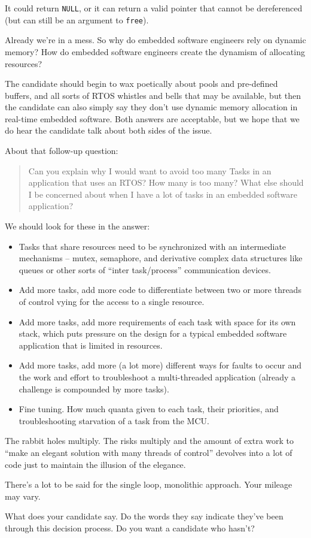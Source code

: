 \documentclass[12pt]{article}
\newcommand{\NULL}{{\texttt{NULL}}}%
\begin{document}
\begin{enumerate}
It could return \NULL, or it can return a valid pointer that cannot be dereferenced (but can still be an argument to {\texttt{free}}).

Already we're in a mess. So why do embedded software engineers rely on dynamic memory?  How do embedded software engineers create
the dynamism of allocating resources?  

The candidate should begin to wax poetically about pools and pre-defined buffers, and all sorts of RTOS whistles and bells that may be available,
but then the candidate can also simply say they don't use dynamic memory allocation in real-time embedded software.  Both answers are acceptable,
but we hope that we do hear the candidate talk about both sides of the issue.

About that follow-up question: 
\begin{quote}
Can you explain why I would want to avoid
too many Tasks in an application that uses an RTOS?  How many is too many?
What else should I be concerned about when I have a lot of tasks in an
embedded software application?
\end{quote}

We should look for these in the answer:
\begin{itemize}
\item Tasks that share resources need to be synchronized with an intermediate
mechanisms -- mutex, semaphore, and derivative complex data structures like queues 
or other sorts of ``inter task/process'' communication devices.   
\item Add more tasks, add more code to differentiate between two or more threads of
control vying for the access to a single resource.
\item Add more tasks, add more requirements of each task with space for its
own stack, which puts pressure on the design for a typical embedded software application
that is limited in resources.
\item Add more tasks, add more (a lot more) different ways for faults to occur and the
work and effort to troubleshoot a multi-threaded application (already a challenge
is compounded by more tasks).
\item Fine tuning.  How much quanta given to each task, their priorities, and troubleshooting
starvation of a task from the MCU.
\end{itemize}

The rabbit holes multiply.  The risks multiply and the amount of extra work to ``make
an elegant solution with many threads of control'' devolves into a lot of code just to maintain
the illusion of the elegance.

There's a lot to be said for the single loop, monolithic approach.   Your mileage may vary.

What does your candidate say.  Do the words they say indicate they've been through this
decision process.  Do you want a candidate who hasn't?

\end{enumerate}
\end{document}
